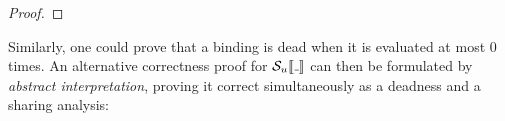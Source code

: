 \begin{proof}
%
%
%
\end{proof}

Similarly, one could prove that a binding is dead when it is evaluated at most 0
times.
An alternative correctness proof for $\semusg{\wild}$ can then be formulated by
\emph{abstract interpretation}, proving it correct simultaneously as a deadness
and a sharing analysis:

